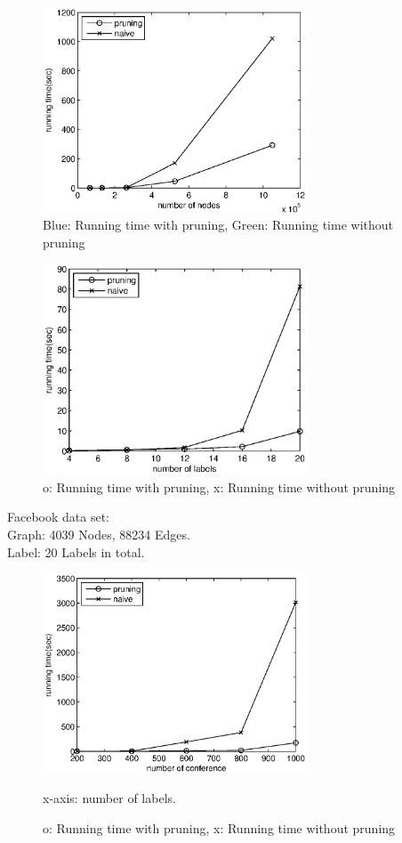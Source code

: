 \begin{figure}[h]
    \centering
      \includegraphics[width=0.7\textwidth]{figs/kronecker}
    \caption{\label{fig:exp:kronecker}Blue: Running time with pruning, Green: Running time without pruning}
\end{figure}



\begin{figure}[h]
    \centering
      \includegraphics[width=0.7\textwidth]{figs/FB}
    \caption{o: Running time with pruning, x: Running time without pruning}
\end{figure}

Facebook data set:\\
Graph: 4039 Nodes, 88234 Edges.\\
Label: 20 Labels in total.\\
    
\begin{figure}[h]
    \centering
      \includegraphics[width=0.7\textwidth]{figs/DBLP}
    \caption{o: Running time with pruning, x: Running time without pruning}
    x-axis: number of labels.
\end{figure}

